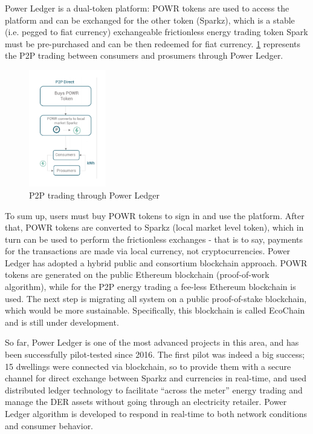 Power Ledger is a dual-token platform: POWR tokens are used to access the platform and can be exchanged for the other token (Sparkz), which is a stable (i.e. pegged to fiat currency) exchangeable frictionless energy trading token Spark must be pre-purchased \cite{powerledgerwhitepaper} and can be then redeemed for fiat currency. \cref{fig:plp2p} represents the \ac{P2P} trading between consumers and prosumers through Power Ledger. 




 \begin{figure}[h]
\centering
\includegraphics[width=0.3\textwidth]{./Images/plp2p}
\caption{\ac{P2P} trading through Power Ledger}
\label{fig:plp2p}
\end{figure}


To sum up, users must buy POWR tokens to sign in and use the platform. After that, POWR tokens are converted to Sparkz (local market level token), which in turn can be used to perform the frictionless exchanges - that is to say, payments for the transactions are made via local currency, not cryptocurrencies. Power Ledger has adopted a hybrid public and consortium blockchain approach. POWR tokens are generated on the public Ethereum blockchain (proof-of-work algorithm), while for the P2P energy trading a fee-less Ethereum blockchain is used. The next step is migrating all system on a public proof-of-stake blockchain, which would be more sustainable. Specifically, this blockchain is called EcoChain and is still under development.



So far, Power Ledger is one of the most advanced projects in this area, and has been successfully pilot-tested since 2016. The first pilot was indeed a big success; 15 dwellings were connected via blockchain, so to provide them with a secure channel for direct exchange between Sparkz and currencies in real-time, and used distributed ledger technology to facilitate “across the meter” energy trading and manage the \ac{DER} assets without going through an electricity retailer. Power Ledger algorithm is developed to respond in real-time to both network conditions and consumer behavior.   


